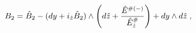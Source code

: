 \begin{equation}\label{TBsg-r1}
{{B}}_2=  \hat{{B}}_2 -
(dy + i_{\hat{z}} \hat{B}_2) \wedge
\left(d\hat{z}+ {\hat{E}^{ {\#}(-)}
\over \hat{E}_{\hat{z}}^{ {\#}}}\right) + dy \wedge d\hat{z}\; ,    
\end{equation} 

